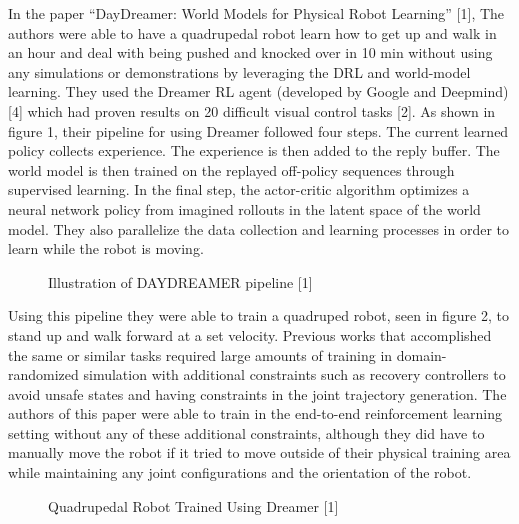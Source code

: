 \documentclass{article}
\begin{document}
In the paper “DayDreamer: World Models for Physical Robot Learning” [1], The authors were able to have a quadrupedal robot learn how to get up and walk in an hour and deal with being pushed and knocked over in 10 min without using any simulations or demonstrations by leveraging the DRL and world-model learning. They used the Dreamer RL agent (developed by Google and Deepmind) [4] which had proven results on 20 difficult visual control tasks [2]. As shown in figure 1, their pipeline for using Dreamer followed four steps. The current learned policy collects experience. The experience is then added to the reply buffer. The world model is then trained on the replayed off-policy sequences through supervised learning. In the final step, the actor-critic algorithm optimizes a neural network policy from imagined rollouts in the latent space of the world model. They also parallelize the data collection and learning processes in order to learn while the robot is moving.

\begin{figure}[H]
  \centering
  \caption{Illustration of DAYDREAMER pipeline [1]}
\end{figure}

Using this pipeline they were able to train a quadruped robot, seen in figure 2, to stand up and walk forward at a set velocity. Previous works that accomplished the same or similar tasks required large amounts of training in domain-randomized simulation with additional constraints such as recovery controllers to avoid unsafe states and having constraints in the joint trajectory generation. The authors of this paper were able to train in the end-to-end reinforcement learning setting without any of these additional constraints, although they did have to manually move the robot if it tried to move outside of their physical training area while maintaining any joint configurations and the orientation of the robot. 

\begin{figure}[H]
  \centering
  \caption{Quadrupedal Robot Trained Using Dreamer [1]}
\end{figure}
\end{document}
